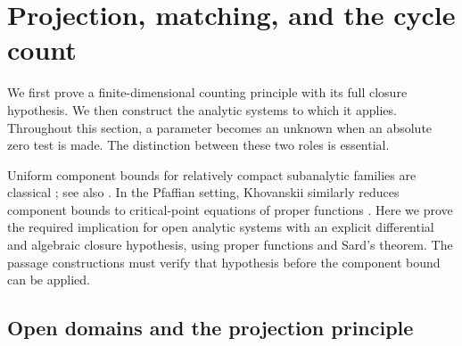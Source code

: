 \section{Projection, matching, and the cycle count}\label{sec:counting}

We first prove a finite-dimensional counting principle with its full
closure hypothesis.  We then construct the analytic systems to which it
applies.  Throughout this section, a parameter becomes an unknown when
an absolute zero test is made.  The distinction between these two roles
is essential.

Uniform component bounds for relatively compact subanalytic families
are classical \citep[Corollary~1]{Gabrielov1968}; see also
\citet[Theorem~3.14]{BierstoneMilman1988}.
In the Pfaffian setting, Khovanskii similarly reduces component bounds
to critical-point equations of proper functions
\citep[\S4, Theorems~3--4]{Khovanskii1984Finiteness}.
Here we prove the required implication for open analytic systems with
an explicit differential and algebraic closure hypothesis, using proper
functions and Sard's theorem. The passage constructions must verify
that hypothesis before the component bound can be applied.

\subsection{Open domains and the projection principle}

